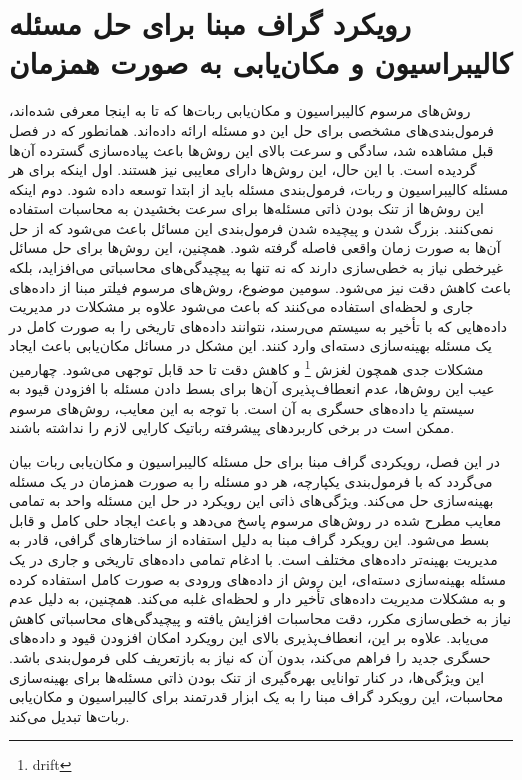 \section{رویکرد گراف مبنا برای حل مسئله کالیبراسیون و مکان‌یابی به صورت همزمان}
روش‌های مرسوم کالیبراسیون و مکان‌یابی ربات‌ها که تا به اینجا معرفی شده‌اند، فرمول‌بندی‌های مشخصی برای حل این دو مسئله ارائه داده‌اند. همانطور که در فصل قبل مشاهده شد، سادگی و سرعت بالای این روش‌ها باعث پیاده‌سازی گسترده آن‌ها گردیده است. با این حال، این روش‌ها دارای معایبی نیز هستند. 
اول اینکه برای هر مسئله کالیبراسیون و ربات، فرمول‌بندی مسئله باید از ابتدا توسعه داده شود. دوم اینکه  این روش‌ها از تنک بودن ذاتی مسئله‌ها برای سرعت بخشیدن به محاسبات استفاده نمی‌کنند.  بزرگ شدن و پیچیده شدن فرمول‌بندی این مسائل باعث می‌شود که از حل آن‌ها به صورت زمان واقعی فاصله گرفته شود.  همچنین، این روش‌ها برای حل مسائل غیرخطی نیاز به خطی‌سازی دارند که نه تنها به پیچیدگی‌های محاسباتی می‌افزاید، بلکه باعث کاهش دقت نیز می‌شود. 
سومین موضوع،  روش‌های مرسوم فیلتر مبنا از داده‌های جاری و لحظه‌ای استفاده می‌کنند که باعث می‌شود علاوه بر مشکلات در مدیریت داده‌هایی که با تأخیر به سیستم می‌رسند، نتوانند داده‌های تاریخی را به صورت کامل در یک مسئله بهینه‌سازی دسته‌ای وارد کنند. این مشکل در مسائل مکان‌یابی باعث ایجاد مشکلات جدی همچون لغزش
\footnote{drift}
و کاهش دقت تا حد قابل توجهی می‌شود. چهارمین عیب این روش‌ها، عدم انعطاف‌پذیری آن‌ها برای بسط دادن مسئله با افزودن قیود به سیستم یا داده‌های حسگری به آن است. با توجه به این معایب، روش‌های مرسوم ممکن است در برخی کاربردهای پیشرفته رباتیک کارایی لازم را نداشته باشند. 

در این فصل، رویکردی گراف مبنا برای حل مسئله کالیبراسیون و مکان‌یابی ربات بیان می‌گردد که با فرمول‌بندی یکپارچه، هر دو مسئله را به صورت همزمان در یک مسئله بهینه‌سازی حل می‌کند. ویژگی‌های ذاتی این رویکرد در حل این مسئله واحد به تمامی معایب مطرح شده در روش‌های مرسوم پاسخ می‌دهد و باعث ایجاد حلی کامل و قابل بسط می‌شود. این رویکرد گراف مبنا به دلیل استفاده از ساختارهای گرافی، قادر به مدیریت بهینه‌تر داده‌های مختلف است. با ادغام تمامی داده‌های تاریخی و جاری در یک مسئله بهینه‌سازی دسته‌ای، این روش از داده‌های ورودی به صورت کامل استفاده کرده و به مشکلات مدیریت داده‌های تأخیر دار و لحظه‌ای غلبه می‌کند. همچنین، به دلیل عدم نیاز به خطی‌سازی مکرر، دقت محاسبات افزایش یافته و پیچیدگی‌های محاسباتی کاهش می‌یابد. علاوه بر این، انعطاف‌پذیری بالای این رویکرد امکان افزودن قیود و داده‌های حسگری جدید را فراهم می‌کند، بدون آن که نیاز به بازتعریف کلی فرمول‌بندی باشد. این ویژگی‌ها، در کنار توانایی بهره‌گیری از تنک بودن ذاتی مسئله‌ها برای بهینه‌سازی محاسبات، این رویکرد گراف مبنا را به یک ابزار قدرتمند برای کالیبراسیون و مکان‌یابی ربات‌ها تبدیل می‌کند.

